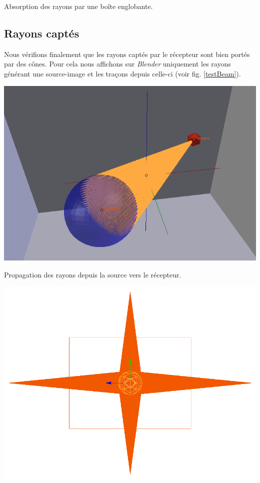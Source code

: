 \begin{figureth}
\begin{subfigureth}{0.45\textwidth}
	\end{subfigureth}
	\caption{Absorption des rayons par une boîte englobante.}
	\label{testBE}
\end{figureth}

\subsection{Rayons captés}
Nous vérifions finalement que les rayons captés par le récepteur sont bien portés par des cônes. Pour cela nous affichons sur \textit{Blender} uniquement les rayons générant une source-image et les traçons depuis celle-ci (voir fig. \ref{testBeam}).

\begin{figureth}
	\begin{subfigureth}{0.45\textwidth}
		\includegraphics[width=\linewidth]{images/testBeam}
		\caption{Propagation des rayons depuis la source vers le récepteur.}
		\label{testBeam1}
	\end{subfigureth}
	\quad
	\begin{subfigureth}{0.45\textwidth}
		\includegraphics[width=\linewidth]{images/testBeam2}

\end{subfigureth}
\end{figureth}
